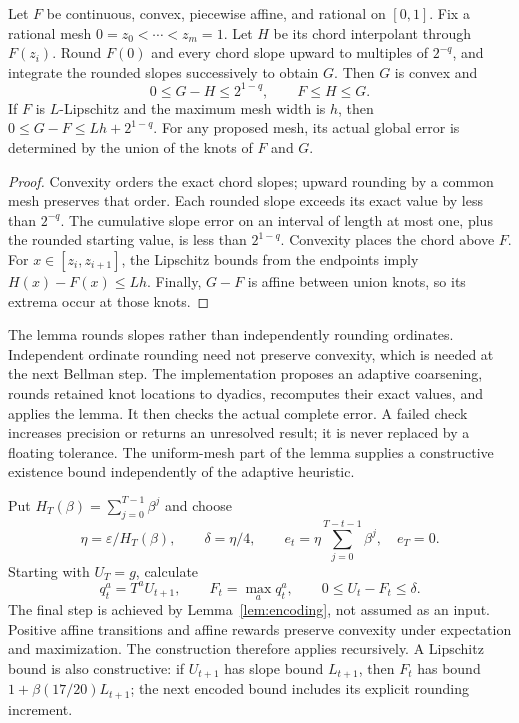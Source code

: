 \begin{lemma}\label{lem:encoding}
Let $F$ be continuous, convex, piecewise affine, and rational on $[0,1]$. Fix a rational mesh $0=z_0<\cdots<z_m=1$. Let $H$ be its chord interpolant through $F(z_i)$. Round $F(0)$ and every chord slope upward to multiples of $2^{-q}$, and integrate the rounded slopes successively to obtain $G$. Then $G$ is convex and
\begin{equation}
 0\le G-H\le 2^{1-q},\qquad F\le H\le G.
\end{equation}
If $F$ is $L$-Lipschitz and the maximum mesh width is $h$, then $0\le G-F\le Lh+2^{1-q}$. For any proposed mesh, its actual global error is determined by the union of the knots of $F$ and $G$.
\end{lemma}
\begin{proof}
Convexity orders the exact chord slopes; upward rounding by a common mesh preserves that order. Each rounded slope exceeds its exact value by less than $2^{-q}$. The cumulative slope error on an interval of length at most one, plus the rounded starting value, is less than $2^{1-q}$. Convexity places the chord above $F$. For $x\in[z_i,z_{i+1}]$, the Lipschitz bounds from the endpoints imply $H(x)-F(x)\le Lh$. Finally, $G-F$ is affine between union knots, so its extrema occur at those knots.\end{proof}
The lemma rounds slopes rather than independently rounding ordinates. Independent ordinate rounding need not preserve convexity, which is needed at the next Bellman step. The implementation proposes an adaptive coarsening, rounds retained knot locations to dyadics, recomputes their exact values, and applies the lemma. It then checks the actual complete error. A failed check increases precision or returns an unresolved result; it is never replaced by a floating tolerance. The uniform-mesh part of the lemma supplies a constructive existence bound independently of the adaptive heuristic.

Put $H_T(\beta)=\sum_{j=0}^{T-1}\beta^j$ and choose
\begin{equation}\label{eq:budget}
 \eta=\varepsilon/H_T(\beta),\qquad \delta=\eta/4,\qquad
 e_t=\eta\sum_{j=0}^{T-t-1}\beta^j,\quad e_T=0.
\end{equation}
Starting with $U_T=g$, calculate
\begin{equation}\label{eq:construct}
 q_t^a=T^aU_{t+1},\qquad F_t=\max_a q_t^a,
 \qquad 0\le U_t-F_t\le\delta.
\end{equation}
The final step is achieved by Lemma~\ref{lem:encoding}, not assumed as an input. Positive affine transitions and affine rewards preserve convexity under expectation and maximization. The construction therefore applies recursively. A Lipschitz bound is also constructive: if $U_{t+1}$ has slope bound $L_{t+1}$, then $F_t$ has bound $1+\beta(17/20)L_{t+1}$; the next encoded bound includes its explicit rounding increment.

